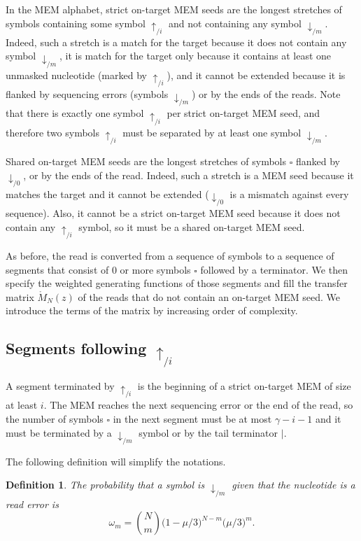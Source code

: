 \documentclass{article}
\newtheorem{definition}{Definition}
\begin{document}
In the MEM alphabet, strict on-target MEM seeds are the longest stretches
of symbols containing some symbol $\uparrow_{/i}$ and not containing any
symbol $\downarrow_{/m}$. Indeed, such a stretch is a match for the target
because it does not contain any symbol $\downarrow_{/m}$, it is match for
the target only because it contains at least one unmasked nucleotide
(marked by $\uparrow_{/i}$), and it cannot be extended because it is
flanked by sequencing errors (symbols $\downarrow_{/m}$) or by the ends of
the reads. Note that there is exactly one symbol $\uparrow_{/i}$ per
strict on-target MEM seed, and therefore two symbols $\uparrow_{/i}$ must
be separated by at least one symbol $\downarrow_{/m}$.

Shared on-target MEM seeds are the longest stretches of symbols $\square$
flanked by $\downarrow_{/0}$, or by the ends of the read. Indeed, such a
stretch is a MEM seed because it matches the target and it cannot be
extended ($\downarrow_{/0}$ is a mismatch against every sequence). Also,
it cannot be a strict on-target MEM seed because it does not contain any
$\uparrow_{/i}$ symbol, so it must be a shared on-target MEM seed.

As before, the read is converted from a sequence of symbols to a sequence
of segments that consist of 0 or more symbols $\square$ followed by a
terminator. We then specify the weighted generating functions of those
segments and fill the transfer matrix $\mathring{M}_N(z)$ of the reads that
do not contain an on-target MEM seed. We introduce the terms of the matrix
by increasing order of complexity.


\subsection{Segments following $\uparrow_{/i}$}

A segment terminated by $\uparrow_{/i}$ is the beginning of a strict
on-target MEM of size at least $i$. The MEM reaches the next sequencing
error or the end of the read, so the number of symbols $\square$ in the
next segment must be at most $\gamma-i-1$ and it must be terminated by a
$\downarrow_{/m}$ symbol or by the tail terminator $|$.

The following definition will simplify the notations.

\begin{definition}
The probability that a symbol is $\downarrow_{/m}$ given that the
nucleotide is a read error is
\begin{equation}
\label{eq:omega}
\omega_m = {N \choose m} \big(1 - \mu/3\big)^{N-m} \big(\mu/3\big)^m.
\end{equation}
\end{definition}
\end{document}
